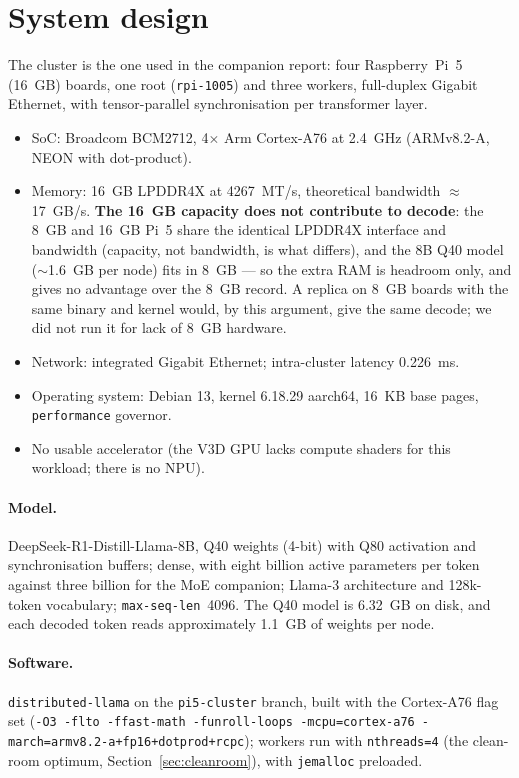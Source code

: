 \documentclass[10pt,a4paper]{article}
\begin{document}
\section{System design}
The cluster is the one used in the companion report: four Raspberry~Pi~5 (16~GB) boards, one root (\texttt{rpi-1005}) and three workers, full-duplex Gigabit Ethernet, with tensor-parallel synchronisation per transformer layer.
\begin{itemize}
  \item SoC: Broadcom BCM2712, 4$\times$ Arm Cortex-A76 at 2.4~GHz (ARMv8.2-A, NEON with dot-product).
  \item Memory: 16~GB LPDDR4X at 4267~MT/s, theoretical bandwidth $\approx$17~GB/s. \textbf{The 16~GB capacity does not contribute to decode}: the 8~GB and 16~GB Pi~5 share the identical LPDDR4X interface and bandwidth (capacity, not bandwidth, is what differs), and the 8B Q40 model ($\sim$1.6~GB per node) fits in 8~GB --- so the extra RAM is headroom only, and gives no advantage over the 8~GB record. A replica on 8~GB boards with the same binary and kernel would, by this argument, give the same decode; we did not run it for lack of 8~GB hardware.
  \item Network: integrated Gigabit Ethernet; intra-cluster latency 0.226~ms.
  \item Operating system: Debian 13, kernel 6.18.29 aarch64, 16~KB base pages, \texttt{performance} governor.
  \item No usable accelerator (the V3D GPU lacks compute shaders for this workload; there is no NPU).
\end{itemize}

\paragraph{Model.} DeepSeek-R1-Distill-Llama-8B, Q40 weights (4-bit) with Q80 activation and synchronisation buffers; dense, with eight billion active parameters per token against three billion for the MoE companion; Llama-3 architecture and 128k-token vocabulary; \texttt{max-seq-len}~4096. The Q40 model is 6.32~GB on disk, and each decoded token reads approximately 1.1~GB of weights per node.

\paragraph{Software.} \texttt{distributed-llama} on the \texttt{pi5-cluster} branch, built with the Cortex-A76 flag set (\texttt{-O3 -flto -ffast-math -funroll-loops -mcpu=cortex-a76 -march=armv8.2-a+fp16+dotprod+rcpc}); workers run with \texttt{nthreads=4} (the clean-room optimum, Section~\ref{sec:cleanroom}), with \texttt{jemalloc} preloaded.
\end{document}
